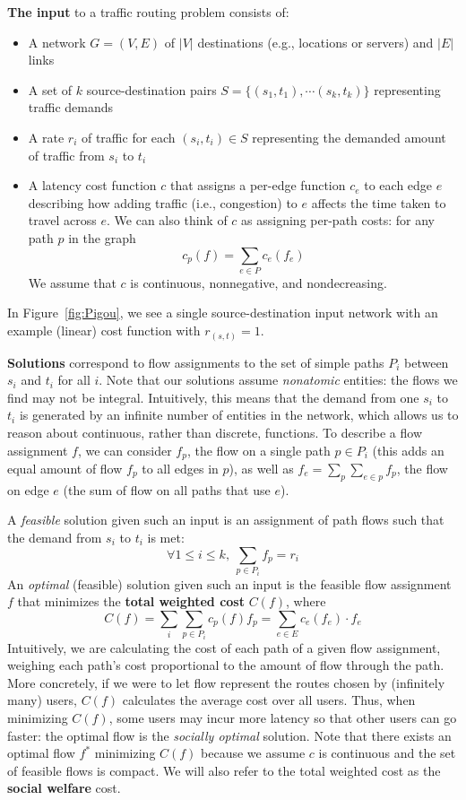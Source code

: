 \medskip\noindent
\textbf{The input} to a traffic routing problem consists of:
\begin{itemize}
    \item A network $G = (V, E)$ of $|V|$ destinations (e.g., locations or servers) and $|E|$ links 
     \item A set of $k$ source-destination pairs $S=\{(s_1,t_1), \cdots (s_k,t_k)\}$ representing traffic demands
    \item A {rate} $r_i$ of traffic for each $(s_i,t_i)\in S$ representing the demanded amount of traffic from $s_i$ to $t_i$
    \item A {latency} cost function $c$ that assigns a per-edge function $c_e$ to each edge $e$ describing how adding traffic (i.e., congestion) to $e$ affects the time taken to travel across $e$. We can also think of $c$ as assigning per-path costs: for any path $p$ in the graph
        $$c_p(f) = \sum_{e\in P}c_e(f_e)$$ 
        We assume that $c$ is continuous, nonnegative, and nondecreasing.
\end{itemize}
In Figure~\ref{fig:Pigou}, we see a single source-destination input network with an example (linear) cost function with $r_{(s,t)} = 1$.

\medskip\noindent
\textbf{Solutions} correspond to flow assignments to the set of simple paths $P_i$ between $s_i$ and $t_i$ for all $i$. Note that our solutions assume \emph{nonatomic} entities: the flows we find may not be integral.
Intuitively, this means that the demand from one $s_i$ to $t_i$ is generated by an infinite number
of entities in the network, which allows us to reason about continuous, rather than discrete, functions.
%
To describe a flow assignment $f$, we can consider $f_p$, the flow on a single path $p \in P_i$ (this adds an equal amount of flow $f_p$ to all edges in $p$), as well as $f_e = \sum_p \sum_{e\in p} f_p$, the flow on edge $e$ (the sum of flow on all paths that use $e$).

A \emph{feasible} solution given such an input is an assignment of path flows such that the demand from $s_i$ to $t_i$ is met:
$$\forall 1 \le i \le k,~\sum_{p\in P_i} f_p = r_i$$
%
An \emph{optimal} (feasible) solution given such an input is the feasible flow assignment $f$ that minimizes the \textbf{total weighted cost} $C(f)$, where
$$C(f) = \sum_i\sum_{p\in P_i}c_p(f)f_p = \sum_{e\in E} c_e(f_e)\cdot f_e$$
Intuitively, we are calculating the cost of each path of a given flow assignment, weighing 
each path's cost proportional to the amount of flow through the path. More concretely,
if we were to let flow represent the routes chosen by (infinitely many) users, $C(f)$ calculates the average cost over all users. Thus, when minimizing $C(f)$, some users may incur 
more latency so that other users can go faster: the optimal flow is the \emph{socially optimal} solution.
Note that there exists an optimal flow $f^*$ minimizing $C(f)$ because we assume $c$ is continuous and the set of feasible flows is compact.
We will also refer to the total weighted cost as the \textbf{social welfare} cost.


